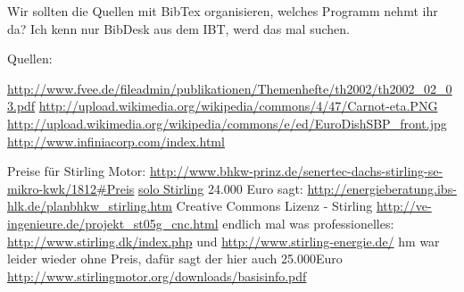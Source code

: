 \documentclass[fontsize=10pt,paper=a4,bibliography=totoc]{scrartcl}
\begin{document}
\newpage
Wir sollten die Quellen mit BibTex organisieren, welches Programm nehmt ihr da? Ich kenn nur BibDesk aus dem IBT, werd das mal suchen.

Quellen:

\url{http://www.fvee.de/fileadmin/publikationen/Themenhefte/th2002/th2002_02_03.pdf}
\url{http://upload.wikimedia.org/wikipedia/commons/4/47/Carnot-eta.PNG}
\url{http://upload.wikimedia.org/wikipedia/commons/e/ed/EuroDishSBP_front.jpg}
\url{http://www.infiniacorp.com/index.html}


Preise für Stirling Motor:
\url{http://www.bhkw-prinz.de/senertec-dachs-stirling-se-mikro-kwk/1812#Preis}
\url{solo Stirling}
24.000 Euro sagt:
\url{http://energieberatung.ibs-hlk.de/planbhkw_stirling.htm}
Creative Commons Lizenz - Stirling
\url{http://ve-ingenieure.de/projekt_st05g_cnc.html}
endlich mal was professionelles:
\url{http://www.stirling.dk/index.php} und \url{http://www.stirling-energie.de/}
hm war leider wieder ohne Preis, dafür sagt der hier auch 25.000Euro
\url{http://www.stirlingmotor.org/downloads/basisinfo.pdf}
\end{document}
